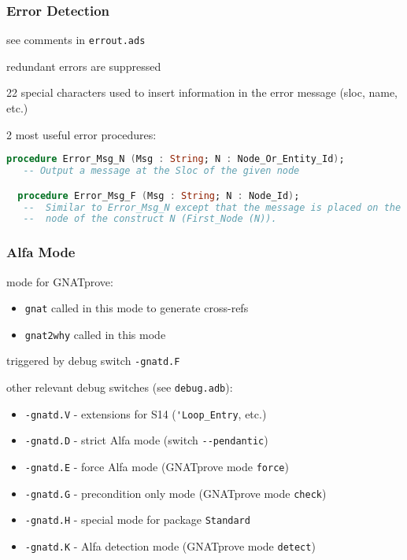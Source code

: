 \documentclass{beamer}
\newcommand{\vs}{\vspace{0.5cm}}
\newenvironment{specialframe}{%
  \begin{frame}[fragile,environment=specialframe]}{\end{frame}}
\begin{document}
\begin{specialframe}
  \frametitle{Error Detection}

see comments in \verb|errout.ads|

\vs

redundant errors are suppressed

\vs

22 special characters used to insert information in the error message (sloc,
name, etc.)

\vs

2 most useful error procedures:
\begin{lstlisting}[language=ada]
  procedure Error_Msg_N (Msg : String; N : Node_Or_Entity_Id);
   -- Output a message at the Sloc of the given node

  procedure Error_Msg_F (Msg : String; N : Node_Id);
   --  Similar to Error_Msg_N except that the message is placed on the first
   --  node of the construct N (First_Node (N)).
\end{lstlisting}
\end{specialframe}

\begin{specialframe}
  \frametitle{Alfa Mode}

mode for GNATprove:
\begin{itemize}
\item \verb|gnat| called in this mode to generate cross-refs
\item \verb|gnat2why| called in this mode
\end{itemize}

\vs

triggered by debug switch \verb|-gnatd.F|

\vs

other relevant debug switches (see \verb|debug.adb|):
\begin{itemize}
\item \verb|-gnatd.V| - extensions for S14 (\verb|'Loop_Entry|, etc.)
\item \verb|-gnatd.D| - strict Alfa mode (switch \verb|--pendantic|)
\item \verb|-gnatd.E| - force Alfa mode (GNATprove mode \verb|force|)
\item \verb|-gnatd.G| - precondition only mode (GNATprove mode \verb|check|)
\item \verb|-gnatd.H| - special mode for package \verb|Standard|
\item \verb|-gnatd.K| - Alfa detection mode (GNATprove mode \verb|detect|)
\end{itemize}

\end{specialframe}
\end{document}
